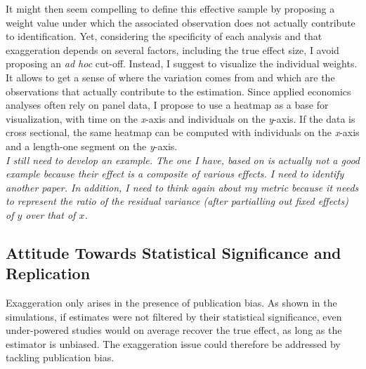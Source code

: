 \documentclass[usletter, 12pt]{article}
\begin{document}
				It might then seem compelling to define this effective sample by proposing a weight value under which the associated observation does not actually contribute to  identification. Yet, considering the specificity of each analysis and that exaggeration depends on several factors, including the true effect size, I avoid proposing an \textit{ad hoc} cut-off. Instead, I suggest to visualize the individual weights. It allows to get a sense of where the variation comes from and which are the observations that actually contribute to the estimation. Since applied economics analyses often rely on panel data, I propose to use a heatmap as a base for visualization, with time on the \textit{x}-axis and individuals on the \textit{y}-axis. If the data is cross sectional, the same heatmap can be computed with individuals on the \textit{x}-axis and a length-one segment on the \textit{y}-axis.\\
				
				\textit{I still need to develop an example. The one I have, based on \cite{deschenes_economic_2007} is actually not a good example because their effect is a composite of various effects. I need to identify another paper. In addition, I need to think again about my metric because it needs to represent the ratio of the residual variance (after partialling out fixed effects) of $y$ over that of $x$.}
				
				
				
	\subsection{Attitude Towards Statistical Significance and Replication}
	
		Exaggeration only arises in the presence of publication bias. As shown in the simulations, if estimates were not filtered by their statistical significance, even under-powered studies would on average recover the true effect, as long as the estimator is unbiased. The exaggeration issue could therefore be addressed by tackling publication bias. 
		
\end{document}
